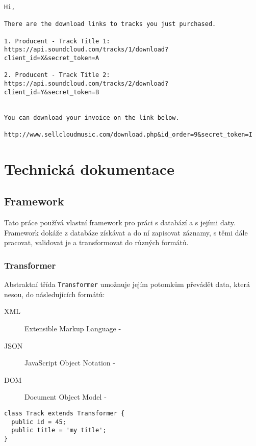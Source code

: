 \documentclass[12pt]{article}
\begin{document}
\lstset{language=HTML}
\begin{lstlisting}[caption={Email při úspěšně dokončené objednávce},label={mail:order}]
Hi,

There are the download links to tracks you just purchased.

1. Producent - Track Title 1:
https://api.soundcloud.com/tracks/1/download?client_id=X&secret_token=A

2. Producent - Track Title 2:
https://api.soundcloud.com/tracks/2/download?client_id=Y&secret_token=B


You can download your invoice on the link below.

http://www.sellcloudmusic.com/download.php&id_order=9&secret_token=I
\end{lstlisting}

\newpage

\section{Technická dokumentace}

\subsection{Framework}
Tato práce používá vlastní framework pro práci s databází a s jejími daty. Framework dokáže z databáze získávat a do ní zapisovat záznamy, s těmi dále pracovat, validovat je a transformovat do různých formátů.

\subsubsection{Transformer}
Abstraktní třída \verb|Transformer| umožnuje jejím potomkům převádět data, která nesou, do následujících formátů:

\begin{description}

  \item[XML] Extensible Markup Language -
  \item[JSON] JavaScript Object Notation -
  \item[DOM] Document Object Model - 

\end{description}


\begin{lstlisting}
class Track extends Transformer {
  public id = 45;
  public title = 'my title';
}
\end{lstlisting}
\end{document}
